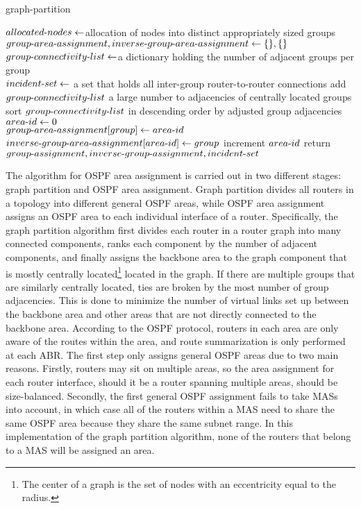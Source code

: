 \documentclass{uiucthesis2021}
\begin{document}
\begin{algorithm}[H]
\caption{graph-partition}\label{alg:cap}
\begin{algorithmic}
    \State $allocated{\text -}nodes \gets $allocation of nodes into distinct appropriately sized groups
    \State $group{\text -}area{\text -}assignment, inverse{\text -}group{\text -}area{\text -}assignment \gets \{\}, \{\}$
    \State $group{\text -}connectivity{\text -}list \gets$a dictionary holding the number of adjacent groups per group
    \\
    \State $incident{\text -}set \gets$ a set that holds all inter-group router-to-router connections
    \State add $group{\text -}connectivity{\text -}list$ a large number to adjacencies of centrally located groups
    \State sort $group{\text -}connectivity{\text -}list$ in descending order by adjusted group adjacencies
    \State $area{\text-}id \gets 0$
    \\
        \State $group{\text -}area{\text -}assignment[group] \gets area{\text-}id$
        \State $inverse{\text-}group{\text -}area{\text -}assignment[area{\text-}id] \gets group$
        \State increment $area{\text-}id$
    \EndFor
    \State return $group{\text-}assignment, inverse{\text-}group{\text-}assignment, incident{\text-}set$
\end{algorithmic}
\end{algorithm} 

\noindent The algorithm for OSPF area assignment is carried out in two different stages: graph partition and OSPF area assignment. Graph partition divides all routers in a topology into different general OSPF areas, while OSPF area assignment assigns an OSPF area to each individual interface of a router. Specifically, the graph partition algorithm first divides each router in a router graph into many connected components, ranks each component by the number of adjacent components, and finally assigns the backbone area to the graph component that is mostly centrally located\footnote{The center of a graph is the set of nodes with an eccentricity equal to the radius.} located in the graph. If there are multiple groups that are similarly centrally located, ties are broken by the most number of group adjacencies. This is done to minimize the number of virtual links set up between the backbone area and other areas that are not directly connected to the backbone area. According to the OSPF protocol, routers in each area are only aware of the routes within the area, and route summarization is only performed at each ABR. The first step only assigns general OSPF areas due to two main reasons. Firstly, routers may sit on multiple areas, so the area assignment for each router interface, should it be a router spanning multiple areas, should be size-balanced. Secondly, the first general OSPF assignment fails to take MASs into account, in which case all of the routers within a MAS need to share the same OSPF area because they share the same subnet range. In this implementation of the graph partition algorithm, none of the routers that belong to a MAS will be assigned an area. \\
\end{document}
